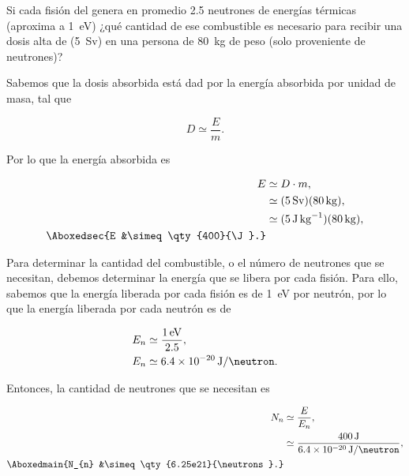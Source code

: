 \documentclass[./../main.tex]{subfiles}
\begin{document}
	\begin{exercise}
		Si cada fisión del  genera en promedio 2.5 neutrones de energías térmicas (aproxima a \qty{1}{\eV}) ¿qué cantidad de ese combustible es necesario para recibir una dosis alta de (\qty{5}{\sievert}) en una persona de \qty{80}{\kg} de peso (solo proveniente de neutrones)?

		\begin{solution}
			Sabemos que la dosis absorbida está dad por la energía absorbida por unidad de masa, tal que
			
			\begin{equation*}
				D \simeq \dfrac{E}{m}.
			\end{equation*}

			Por lo que la energía absorbida es

			\begin{align*}
				E &\simeq D \cdot m,\\
				&\simeq (\qty{5}{\sievert})(\qty{80}{\kg}),\\
				&\simeq (\qty{5}{\J\per\kg})(\qty{80}{\kg}),\\
				\Aboxedsec{E &\simeq \qty{400}{\J}.}
			\end{align*}

			Para determinar la cantidad del combustible, o el número de neutrones que se necesitan, debemos determinar la energía que se libera por cada fisión. Para ello, sabemos que la energía liberada por cada fisión es de \qty{1}{\eV} por neutrón, por lo que la energía liberada por cada neutrón es de

			\begin{align*}
				E_{n} &\simeq \dfrac{\qty{1}{\eV}}{2.5},\\
				E_{n} &\simeq \qty{6.4e-20}{\J\per\neutron}.
			\end{align*}

			Entonces, la cantidad de neutrones que se necesitan es

			\begin{align*}
				N_{n} &\simeq \dfrac{E}{E_{n}},\\
				&\simeq \dfrac{\qty{400}{\J}}{\qty{6.4e-20}{\J\per\neutron}},\\
				\Aboxedmain{N_{n} &\simeq \qty{6.25e21}{\neutrons}.}
			\end{align*}
		\end{solution}
	\end{exercise}
\end{document}
